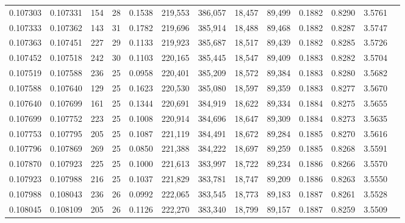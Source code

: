 \begin{tabular}{rrrrrrrrrrrrr}
0.107303 & 0.107331 & 154 &  28 &                                     0.1538 & 219,553 & 386,057 &  18,457 &  89,499 & 0.1882 & 0.8290 & 3.5761 \\
0.107333 & 0.107362 & 143 &  31 &                                     0.1782 & 219,696 & 385,914 &  18,488 &  89,468 & 0.1882 & 0.8287 & 3.5747 \\
0.107363 & 0.107451 & 227 &  29 &                                     0.1133 & 219,923 & 385,687 &  18,517 &  89,439 & 0.1882 & 0.8285 & 3.5726 \\
0.107452 & 0.107518 & 242 &  30 &                                     0.1103 & 220,165 & 385,445 &  18,547 &  89,409 & 0.1883 & 0.8282 & 3.5704 \\
0.107519 & 0.107588 & 236 &  25 &                                     0.0958 & 220,401 & 385,209 &  18,572 &  89,384 & 0.1883 & 0.8280 & 3.5682 \\
0.107588 & 0.107640 & 129 &  25 &                                     0.1623 & 220,530 & 385,080 &  18,597 &  89,359 & 0.1883 & 0.8277 & 3.5670 \\
0.107640 & 0.107699 & 161 &  25 &                                     0.1344 & 220,691 & 384,919 &  18,622 &  89,334 & 0.1884 & 0.8275 & 3.5655 \\
0.107699 & 0.107752 & 223 &  25 &                                     0.1008 & 220,914 & 384,696 &  18,647 &  89,309 & 0.1884 & 0.8273 & 3.5635 \\
0.107753 & 0.107795 & 205 &  25 &                                     0.1087 & 221,119 & 384,491 &  18,672 &  89,284 & 0.1885 & 0.8270 & 3.5616 \\
0.107796 & 0.107869 & 269 &  25 &                                     0.0850 & 221,388 & 384,222 &  18,697 &  89,259 & 0.1885 & 0.8268 & 3.5591 \\
0.107870 & 0.107923 & 225 &  25 &                                     0.1000 & 221,613 & 383,997 &  18,722 &  89,234 & 0.1886 & 0.8266 & 3.5570 \\
0.107923 & 0.107988 & 216 &  25 &                                     0.1037 & 221,829 & 383,781 &  18,747 &  89,209 & 0.1886 & 0.8263 & 3.5550 \\
0.107988 & 0.108043 & 236 &  26 &                                     0.0992 & 222,065 & 383,545 &  18,773 &  89,183 & 0.1887 & 0.8261 & 3.5528 \\
0.108045 & 0.108109 & 205 &  26 &                                     0.1126 & 222,270 & 383,340 &  18,799 &  89,157 & 0.1887 & 0.8259 & 3.5509 \\

\end{tabular}
